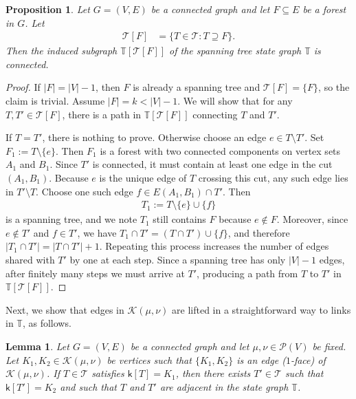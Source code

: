 \documentclass[11pt,a4paper]{article}
\newcommand{\prob}{{\mathscr{P}}}
\newcommand{\setoftrees}{{\mathcal{T}}}
\newcommand{\stategraph}{{\mathbb{T}}}
\newcommand{\embedding}{{\mathsf{k}}}
\newcommand{\flowpoly}{{\mathcal{K}}}
\newtheorem{lemma}[theorem]{Lemma}
\newtheorem{proposition}[theorem]{Proposition}
\begin{document}
    \begin{proposition}\label{prop:connected-fibers}
        Let $G=(V,E)$ be a connected graph and let $F\subseteq E$ be a forest in $G$. Let
            \begin{align*}
                \setoftrees[F] &= \{T\in\setoftrees : T\supseteq F\}.
            \end{align*}
        Then the induced subgraph $\stategraph[\setoftrees[F]]$ of the spanning tree state graph $\stategraph$ is connected.
    \end{proposition}

    \begin{proof}
        If $|F|=|V|-1$, then $F$ is already a spanning tree and $\setoftrees[F]=\{F\}$, so the claim is trivial. Assume $|F|=k<|V|-1$. We will show that for any $T,T'\in\setoftrees[F]$, there is a path in $\stategraph[\setoftrees[F]]$ connecting $T$ and $T'$.

        If $T=T'$, there is nothing to prove. Otherwise choose an edge $e\in T\setminus T'$. Set $F_1 := T\setminus\{e\}$. Then $F_1$ is a forest with two connected components on vertex sets $A_1$ and $B_1$. Since $T'$ is connected, it must contain at least one edge in the cut $(A_1,B_1)$. Because $e$ is the unique edge of $T$ crossing this cut, any such edge lies in $T'\setminus T$. Choose one such edge $f\in E(A_1,B_1)\cap T'$. Then
            \begin{align*}
                T_1 := T\setminus\{e\}\cup\{f\}
            \end{align*}
        is a spanning tree, and we note $T_1$ still contains $F$ because $e\notin F$. 
        Moreover, since $e\notin T'$ and $f\in T'$, we have $T_1\cap T' = (T\cap T')\cup\{f\}$, and therefore $|T_1\cap T'| = |T\cap T'|+1$. Repeating this process increases the number of edges shared with $T'$ by one at each step. Since a spanning tree has only $|V|-1$ edges, after finitely many steps we must arrive at $T'$, producing a path from $T$ to $T'$ in $\stategraph[\setoftrees[F]]$.
    \end{proof}

    Next, we show that edges in $\flowpoly(\mu,\nu)$ are lifted in a straightforward way to links in $\stategraph$, as follows.

    \begin{lemma}\label{lem:adjacency-in-K}
        Let $G=(V,E)$ be a connected graph and let $\mu,\nu\in\prob(V)$ be fixed. Let $K_1, K_2\in\flowpoly(\mu,\nu)$ be vertices such that $\{K_1, K_2\}$ is an edge ($1$-face) of $\flowpoly(\mu,\nu)$. If $T \in\setoftrees$ satisfies $\embedding[T] = K_1$, then there exists $T'\in\setoftrees$ such that $\embedding[T'] = K_2$ and such that $T$ and $T'$ are adjacent in the state graph $\stategraph$.
    \end{lemma}
\end{document}
